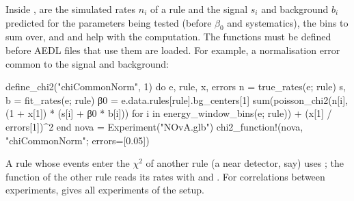 \noindent Inside ,  are the simulated rates
$n_i$ of a rule and  the signal $s_i$ and background
$b_i$ predicted for the parameters being tested (before $\beta_0$ and
systematics),  the bins to sum over, and
 and  help with the
computation. The functions must be defined before AEDL files that use them are
loaded. For example, a normalisation error common to the signal and background:
\begin{julia}
define_chi2("chiCommonNorm", 1) do e, rule, x, errors
    n = true_rates(e; rule)
    s, b = fit_rates(e; rule)
    β0 = e.data.rules[rule].bg_centers[1]
    sum(poisson_chi2(n[i], (1 + x[1]) * (s[i] + β0 * b[i])) for i in energy_window_bins(e; rule)) +
        (x[1] / errors[1])^2
end
nova = Experiment("NOvA.glb")
chi2_function!(nova, "chiCommonNorm"; errors=[0.05])
\end{julia}
A rule whose events enter the $\chi^2$ of another rule (a near detector, say)
uses ; the function of the other rule reads its rates with
 and . For correlations between
experiments,  gives all experiments of the setup.

